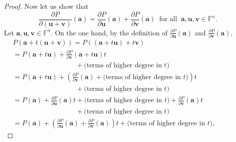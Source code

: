 \documentclass{elsarticle}
\def\F{{\mathbb F}}
\theoremstyle{definition}
\numberwithin{equation}{section}
\begin{document}
\begin{proof}
Now let us show that 
\begin{equation}\label{lem:DirDerLin:eq102}
\frac{\partial P}{\partial (\mathbf u + \mathbf v)}(\mathbf a) = \frac{\partial P}{\partial \mathbf u}(\mathbf a) + \frac{\partial P}{\partial \mathbf v}(\mathbf a)\;\;\mbox{for all}\;\;\mathbf a, \mathbf u, \mathbf v \in \F^n.
\end{equation}
Let $\mathbf a, \mathbf u, \mathbf v \in \F^n$. On the one hand, by the definition of $\frac{\partial P}{\partial \mathbf u}(\mathbf a)$ and $\frac{\partial P}{\partial \mathbf v}(\mathbf a)$,
\begin{multline}\label{lem:DirDerLin:eq3}
P(\mathbf a + t (\mathbf u + \mathbf v)) = P((\mathbf a + t\mathbf u) +   t\mathbf v)\\
= P(\mathbf a + t\mathbf u)  +  \frac{\partial P}{\partial \mathbf v}(\mathbf a + t\mathbf u)t\phantom{XXXXXXXXXXX}\\\phantom{XXXXXXXXXXX} + \mbox{(terms of higher degree in $t$)}\\
= P(\mathbf a + t\mathbf u)  +  \left(\frac{\partial P}{\partial \mathbf v}(\mathbf a)+\mbox{(terms of higher degree in $t$)}\right)t\phantom{XXXXXXX}\\\phantom{XXXXXXXXXXX} + \mbox{(terms of higher degree in $t$)}\\
=  P(\mathbf a)  + \frac{\partial P}{\partial \mathbf u}(\mathbf a) t + \mbox{(terms of higher degree in $t$)} + \frac{\partial P}{\partial \mathbf v}(\mathbf a) t\phantom{XXXXXXX}\\\phantom{XXXXXXXXXXX} + \mbox{(terms of higher degree in $t$)}\\
=  P(\mathbf a) + \left(\frac{\partial P}{\partial \mathbf u}(\mathbf a) + \frac{\partial P}{\partial \mathbf v}(\mathbf a) \right)t + \mbox{(terms of higher degree in $t$)},
\end{multline}




\end{proof}
\end{document}
